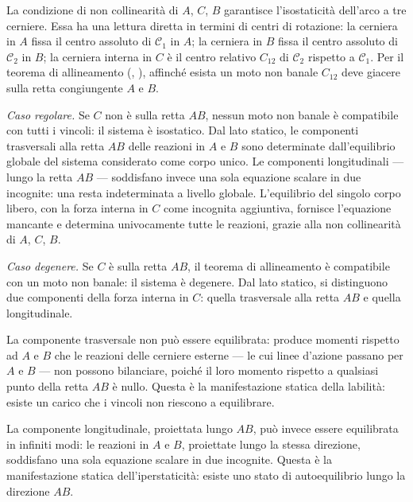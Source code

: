 \begin{oss}
	\label{oss:arco_allineamento}
	La condizione di non collinearità di $A$, $C$, $B$
	garantisce l'isostaticità dell'arco a tre cerniere.
	Essa ha una lettura diretta in termini di centri di
	rotazione: la cerniera in $A$ fissa il centro assoluto
	di $\mathcal{C}_1$ in $A$; la cerniera in $B$ fissa
	il centro assoluto di $\mathcal{C}_2$ in $B$; la
	cerniera interna in $C$ è il centro relativo $C_{12}$
	di $\mathcal{C}_2$ rispetto a $\mathcal{C}_1$. Per il
	teorema di allineamento
	(,
	), affinché esista un moto
	non banale $C_{12}$ deve giacere sulla retta
	congiungente $A$ e $B$.
	
	\smallskip
	\noindent\textit{Caso regolare.}
	Se $C$ non è sulla retta $AB$, nessun moto non
	banale è compatibile con tutti i vincoli: il
	sistema è isostatico. Dal lato statico, le
	componenti trasversali alla retta $AB$ delle
	reazioni in $A$ e $B$ sono determinate
	dall'equilibrio globale del sistema considerato
	come corpo unico. Le componenti longitudinali
	--- lungo la retta $AB$ --- soddisfano invece
	una sola equazione scalare in due incognite:
	una resta indeterminata a livello globale.
	L'equilibrio del singolo corpo libero, con la
	forza interna in $C$ come incognita aggiuntiva,
	fornisce l'equazione mancante e determina
	univocamente tutte le reazioni, grazie alla
	non collinearità di $A$, $C$, $B$.
	
	\smallskip
	\noindent\textit{Caso degenere.}
	Se $C$ è sulla retta $AB$, il teorema di
	allineamento è compatibile con un moto non banale:
	il sistema è degenere. Dal lato statico, si
	distinguono due componenti della forza interna
	in $C$: quella trasversale alla retta $AB$ e
	quella longitudinale.
	
	La componente trasversale non può essere
	equilibrata: produce momenti rispetto ad $A$ e
	$B$ che le reazioni delle cerniere esterne ---
	le cui linee d'azione passano per $A$ e $B$ ---
	non possono bilanciare, poiché il loro momento
	rispetto a qualsiasi punto della retta $AB$ è
	nullo. Questa è la manifestazione statica della
	labilità: esiste un carico che i vincoli non
	riescono a equilibrare.
	
	La componente longitudinale, proiettata lungo
	$AB$, può invece essere equilibrata in infiniti
	modi: le reazioni in $A$ e $B$, proiettate lungo
	la stessa direzione, soddisfano una sola
	equazione scalare in due incognite. Questa è la
	manifestazione statica dell'iperstaticità: esiste
	uno stato di autoequilibrio lungo la direzione
	$AB$.
	

\end{oss}
